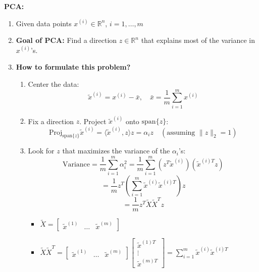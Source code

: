 \begin{example} \textbf{PCA:}
    \begin{enumerate}
        \item Given data points \( x^{(i)} \in \mathbb{R}^n \), $i=1,\ldots,m$
        
        \item \textbf{Goal of PCA:} Find a direction \( z \in \mathbb{R}^n \) that explains most of the variance in \( x^{(i)} \)'s.
        \item \textbf{How to formulate this problem?}
        
        \begin{enumerate}
            \item Center the data:
            \[
            \tilde{x}^{(i)} = x^{(i)} - \bar{x}, \quad \bar{x} = \frac{1}{m} \sum_{i=1}^{m} x^{(i)}
            \]
            
            \item Fix a direction \( z \). Project \( \tilde{x}^{(i)} \) onto \( \text{span}\{z\} \):
            \[
            \text{Proj}_{\text{span}\{z\}} \tilde{x}^{(i)} = \langle \tilde{x}^{(i)}, z \rangle z = \alpha_i z \quad (\text{assuming } \|z\|_2 = 1)
            \]
            
            \item Look for $z$ that maximizes the variance of the \( \alpha_i \)'s:
            \[
            \text{Variance} = \frac{1}{m} \sum_{i=1}^{m} \alpha_i^2 = \frac{1}{m} \sum_{i=1}^{m} \left( z^T \tilde{x}^{(i)} \right) \left( \tilde{x}^{(i)T} z \right)
            \]
            \[
            = \frac{1}{m} z^T \left( \sum_{i=1}^{m} \tilde{x}^{(i)} \tilde{x}^{(i)T} \right) z
            \]
            \[
            = \frac{1}{m} z^T \tilde{X} \tilde{X}^T z
            \]
            \begin{itemize}
                \item $\tilde{X} = \begin{bmatrix} \tilde{x}^{(1)} & \ldots & \tilde{x}^{(m)} \end{bmatrix}$
                \item $
            \tilde{X} \tilde{X}^T = 
            \begin{bmatrix}
            \tilde{x}^{(1)} & \ldots & \tilde{x}^{(m)}
            \end{bmatrix}
            \begin{bmatrix}
            \tilde{x}^{(1)T} \\
            \vdots \\
            \tilde{x}^{(m)T}
            \end{bmatrix}
            = \sum_{i=1}^{m} \tilde{x}^{(i)} \tilde{x}^{(i)T}$
            \end{itemize}
        \end{enumerate}
        

\end{enumerate}
\end{example}
